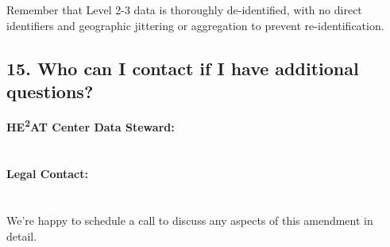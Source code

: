 \documentclass[12pt,letterpaper]{article}
\begin{document}
Remember that Level 2-3 data is thoroughly de-identified, with no direct identifiers and geographic jittering or aggregation to prevent re-identification.

\subsection*{15. Who can I contact if I have additional questions?}

\textbf{HE\textsuperscript{2}AT Center Data Steward:}\\
[NAME]\\
[EMAIL]\\
[PHONE]

\textbf{Legal Contact:}\\
[NAME]\\
[EMAIL]\\
[PHONE]

We're happy to schedule a call to discuss any aspects of this amendment in detail.
\end{document}

